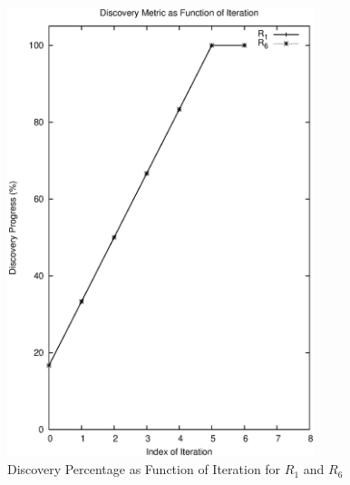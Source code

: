 \documentclass[12pt]{article}  %
\theoremstyle{definition}
\theoremstyle{remark}
\begin{document}
\begin{figure}[h]
\centering
        \includegraphics[width=0.8\textwidth, height=0.8\textheight]{progress.ps}
\caption{Discovery Percentage as Function of Iteration for $R_1$ and $R_6$}
\label{fig:progress}
\end{figure}


%
%
%

% 
%


%
\end{document}
